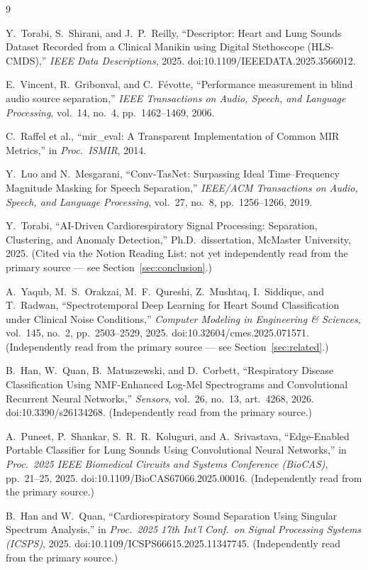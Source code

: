 \documentclass[11pt]{article}
\begin{document}
\begin{thebibliography}{9}

Y.~Torabi, S.~Shirani, and J.~P.~Reilly, ``Descriptor: Heart and Lung Sounds
Dataset Recorded from a Clinical Manikin using Digital Stethoscope
(HLS-CMDS),'' \textit{IEEE Data Descriptions}, 2025.
doi:10.1109/IEEEDATA.2025.3566012.

E.~Vincent, R.~Gribonval, and C.~F\'{e}votte, ``Performance measurement in
blind audio source separation,'' \textit{IEEE Transactions on Audio,
Speech, and Language Processing}, vol.~14, no.~4, pp.~1462--1469, 2006.

C.~Raffel et al., ``mir\_eval: A Transparent Implementation of Common MIR
Metrics,'' in \textit{Proc.\ ISMIR}, 2014.

Y.~Luo and N.~Mesgarani, ``Conv-TasNet: Surpassing Ideal Time--Frequency
Magnitude Masking for Speech Separation,'' \textit{IEEE/ACM Transactions on
Audio, Speech, and Language Processing}, vol.~27, no.~8, pp.~1256--1266,
2019.

Y.~Torabi, ``AI-Driven Cardiorespiratory Signal Processing: Separation,
Clustering, and Anomaly Detection,'' Ph.D.\ dissertation, McMaster
University, 2025. (Cited via the Notion Reading List; not yet
independently read from the primary source --- see
Section~\ref{sec:conclusion}.)

A.~Yaqub, M.~S.~Orakzai, M.~F.~Qureshi, Z.~Mushtaq, I.~Siddique, and
T.~Radwan, ``Spectrotemporal Deep Learning for Heart Sound Classification
under Clinical Noise Conditions,'' \textit{Computer Modeling in
Engineering \& Sciences}, vol.~145, no.~2, pp.~2503--2529, 2025.
doi:10.32604/cmes.2025.071571. (Independently read from the primary
source --- see Section~\ref{sec:related}.)

B.~Han, W.~Quan, B.~Matuszewski, and D.~Corbett, ``Respiratory Disease
Classification Using NMF-Enhanced Log-Mel Spectrograms and Convolutional
Recurrent Neural Networks,'' \textit{Sensors}, vol.~26, no.~13, art.~4268,
2026. doi:10.3390/s26134268. (Independently read from the primary source.)

A.~Puneet, P.~Shankar, S.~R.~R.~Koluguri, and A.~Srivastava,
``Edge-Enabled Portable Classifier for Lung Sounds Using Convolutional
Neural Networks,'' in \textit{Proc.\ 2025 IEEE Biomedical Circuits and
Systems Conference (BioCAS)}, pp.~21--25, 2025.
doi:10.1109/BioCAS67066.2025.00016. (Independently read from the primary
source.)

B.~Han and W.~Quan, ``Cardiorespiratory Sound Separation Using Singular
Spectrum Analysis,'' in \textit{Proc.\ 2025 17th Int'l Conf.\ on Signal
Processing Systems (ICSPS)}, 2025. doi:10.1109/ICSPS66615.2025.11347745.
(Independently read from the primary source.)

\end{thebibliography}
\end{document}
